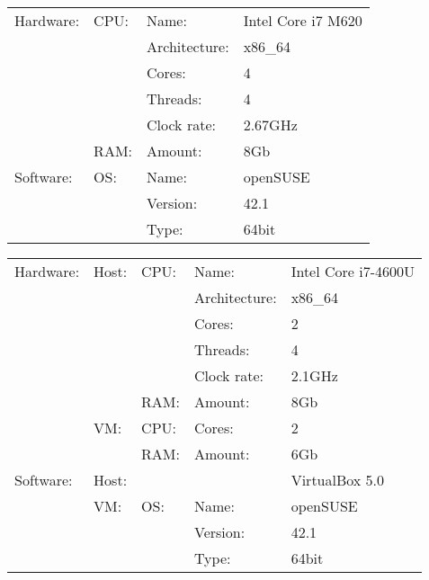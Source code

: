 % 
%               
%          
% 




\begingroup
\renewcommand{\arraystretch}{1.2}
\begin{tabularx}{\linewidth}{@{}lllX}
Hardware:	& CPU:	& Name:		& Intel Core i7 M620	\\
		&	& Architecture:	& x86\_64		\\
		&	& Cores:	& 4			\\
		&	& Threads:	& 4			\\
		&	& Clock rate:	& 2.67GHz		\\
		& RAM:	& Amount:	& 8Gb			\\[0.5ex]
Software:	& OS:	& Name:		& openSUSE		\\
		&	& Version:	& 42.1			\\
		&	& Type:		& 64bit
\end{tabularx}
\endgroup


\begingroup
\renewcommand{\arraystretch}{1.2}
\begin{tabularx}{\linewidth}{@{}llllX}
Hardware:	& Host:	& CPU:	& Name:		& Intel Core i7-4600U	\\
		&	&	& Architecture:	& x86\_64		\\
		&	&	& Cores:	& 2			\\
		&	&	& Threads:	& 4			\\
		&	&	& Clock rate:	& 2.1GHz		\\
		&	& RAM:	& Amount:	& 8Gb			\\[0.5ex]
		& VM:	& CPU:	& Cores:	& 2			\\
		&	& RAM:	& Amount:	& 6Gb			\\[0.5ex]
Software:	& Host:	&	&		& VirtualBox 5.0	\\ 
		& VM:	& OS:	& Name:		& openSUSE		\\
		&	&	& Version:	& 42.1			\\
		&	&	& Type:		& 64bit
\end{tabularx}
\endgroup


